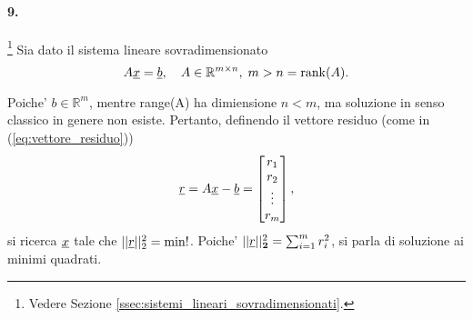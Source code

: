\paragraph{9.}\footnote{Vedere Sezione \ref{ssec:sistemi_lineari_sovradimensionati}.} Sia dato il sistema lineare sovradimensionato
\begin{equation*}
	A\uline x =\uline b,\quad A\in\mathbb R^{m\times n},\; m> n = \rank(A).
\end{equation*}

Poiche' $b\in\mathbb{R}^m$, mentre \gls{range(A)} ha dimiensione $n<m$, ma soluzione in senso classico in genere non esiste. Pertanto, definendo il vettore residuo (come in (\ref{eq:vettore_residuo}))
\begin{equation}\label{eq:vettore_residuo_esercitazione}
	\uline r = A\uline x-\uline b=
	\begin{bmatrix}
		r_1\\
		r_2\\
		\vdots\\
		r_m
	\end{bmatrix},
\end{equation}
si ricerca $\uline x$ tale che $||\uline r||_2^2=\min!$. Poiche' $||\uline r||_{\boldsymbol{2}}^2=\sum_{i=1}^{m}r_i^2$, si parla di soluzione ai minimi quadrati.

